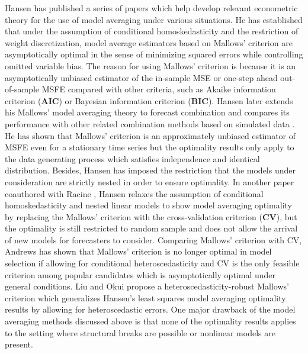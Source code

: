 \documentclass[a4paper,12pt]{article}
\begin{document}
Hansen has published a series of papers \cite{hansen_EMETRICA2007} \cite{hansen_JE2008} \cite{hansen2009averaging} \cite{hansen2011jackknife} which help develop relevant econometric theory for the use of model averaging under various situations. He has established that under the assumption of conditional homoskedasticity and the restriction of weight discretization, model average estimators based on Mallows' criterion are asymptotically optimal in the sense of minimizing squared errors while controlling omitted variable bias. The reason for using Mallows' criterion is because it is an asymptotically unbiased estimator of the in-sample MSE or one-step ahead out-of-sample MSFE compared with other criteria, such as Akaike information criterion (\textbf{AIC}) or Bayesian information criterion (\textbf{BIC}). Hansen later extends his Mallows' model averaging theory to forecast combination and compares its performance with other related combination methods based on simulated data \cite{hansen_JE2008}. He has shown that Mallows' criterion is an approximately unbiased estimator of MSFE even for a stationary time series but the optimality results only apply to the data generating process which satisfies independence and identical distribution. Besides, Hansen has imposed the restriction that the models under consideration are strictly nested in order to ensure optimality. In another paper coauthored with Racine \cite{hansen2011jackknife}, Hansen relaxes the assumption of conditional homoskedasticity and nested linear models to show model averaging optimality by replacing the Mallows' criterion with the cross-validation criterion (\textbf{CV}), but the optimality is still restricted to random sample and does not allow the arrival of new models for forecasters to consider. Comparing Mallows' criterion with CV, Andrews \cite{andrews_JE1991} has shown that Mallows' criterion is no longer optimal in model selection if allowing for conditional heteroscedasticity and CV is the only feasible criterion among popular candidates which is asymptotically optimal under general conditions. Liu and Okui \cite{liu_okui2012} propose a heteroscedasticity-robust Mallows' criterion which generalizes Hansen's least squares model averaging optimality results by allowing for heteroscedastic errors. One major drawback of the model averaging methods discussed above is that none of the optimality results applies to the setting where structural breaks are possible or nonlinear models are present.
\end{document}
